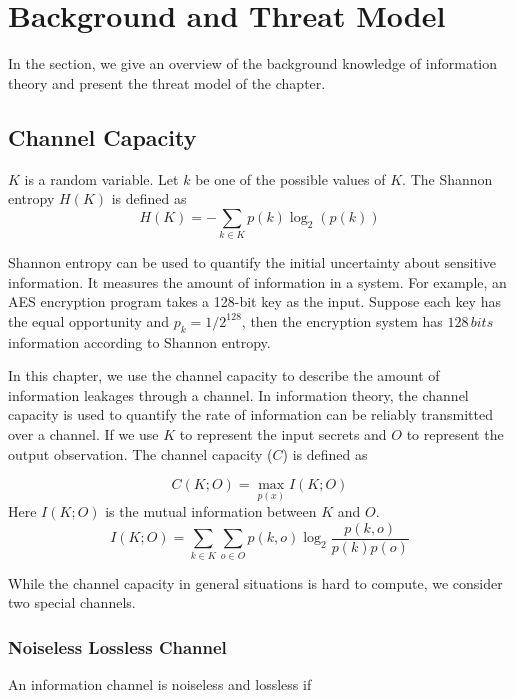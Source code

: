 \section{Background and Threat Model}
In the section, we give an overview of the background knowledge of information theory and present the threat model of the chapter.


\subsection{Channel Capacity}
$K$ is a random variable.
Let $k$ be one of the possible
values of $K$. The Shannon entropy $H(K)$ is defined as
\begin{equation}\label{chapter5:eq1}
  H(K) = - \sum_{k {\in} K}p(k)\log_2(p(k))
\end{equation}

Shannon entropy can be used to quantify the initial uncertainty about sensitive information. It measures the amount of information in a system. For example, an AES encryption program takes a 128-bit key as the input. Suppose each key has the equal opportunity and $p_k = 1/ 2^{128}$, then the encryption system has $128 \, \mathit{bits}$ information according to Shannon entropy.


In this chapter, we use the channel capacity to describe the amount of information leakages through a channel. In information theory, the channel capacity is used to quantify the rate of information can be reliably transmitted over a channel. If we use $K$ to represent the input secrets and $O$ to represent the output observation. The channel capacity ($C$) is defined as

\begin{equation}\label{chapter5:eq2}
  C(K;O) = \max_{p(x)} I(K;O)
\end{equation}
Here $I(K;O)$ is the mutual information between $K$ and $O$.
\begin{equation} \label{chapter5:eq3}
  I(K;O) = \sum_{k {\in} K}{\sum_{o {\in} O}{p(k, o)\log_2\frac{p(k, o)}{p(k)p(o)}}}
\end{equation}

While the channel capacity in general situations is hard to compute, we consider two special channels.

\subsubsection{Noiseless Lossless Channel}
An information channel is noiseless and lossless if

